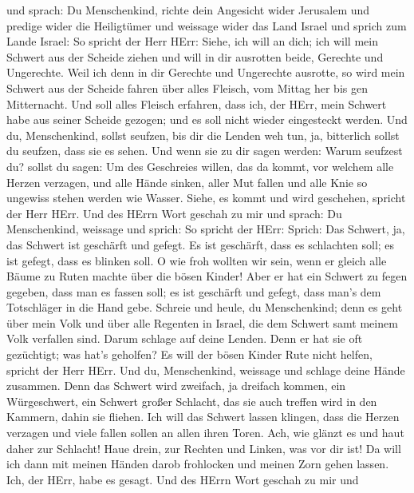 und sprach:  Du Menschenkind, richte dein Angesicht wider
Jerusalem und predige wider die Heiligtümer und weissage wider das Land
Israel  und sprich zum Lande Israel: So spricht der Herr
HErr: Siehe, ich will an dich; ich will mein Schwert aus der Scheide
ziehen und will in dir ausrotten beide, Gerechte und Ungerechte.
 Weil ich denn in dir Gerechte und Ungerechte ausrotte, so
wird mein Schwert aus der Scheide fahren über alles Fleisch, vom Mittag
her bis gen Mitternacht.  Und soll alles Fleisch erfahren,
dass ich, der HErr, mein Schwert habe aus seiner Scheide gezogen; und es
soll nicht wieder eingesteckt werden.  Und du,
Menschenkind, sollst seufzen, bis dir die Lenden weh tun, ja, bitterlich
sollst du seufzen, dass sie es sehen.  Und wenn sie zu dir
sagen werden: Warum seufzest du? sollst du sagen: Um des Geschreies
willen, das da kommt, vor welchem alle Herzen verzagen, und alle Hände
sinken, aller Mut fallen und alle Knie so ungewiss stehen werden wie
Wasser. Siehe, es kommt und wird geschehen, spricht der Herr HErr.
 Und des HErrn Wort geschah zu mir und sprach:
 Du Menschenkind, weissage und sprich: So spricht der HErr:
Sprich: Das Schwert, ja, das Schwert ist geschärft und gefegt.
 Es ist geschärft, dass es schlachten soll; es ist gefegt,
dass es blinken soll. O wie froh wollten wir sein, wenn er gleich alle
Bäume zu Ruten machte über die bösen Kinder!  Aber er hat
ein Schwert zu fegen gegeben, dass man es fassen soll; es ist geschärft
und gefegt, dass man's dem Totschläger in die Hand gebe. 
Schreie und heule, du Menschenkind; denn es geht über mein Volk und über
alle Regenten in Israel, die dem Schwert samt meinem Volk verfallen
sind. Darum schlage auf deine Lenden.  Denn er hat sie oft
gezüchtigt; was hat's geholfen? Es will der bösen Kinder Rute nicht
helfen, spricht der Herr HErr.  Und du, Menschenkind,
weissage und schlage deine Hände zusammen. Denn das Schwert wird
zweifach, ja dreifach kommen, ein Würgeschwert, ein Schwert großer
Schlacht, das sie auch treffen wird in den Kammern, dahin sie fliehen.
 Ich will das Schwert lassen klingen, dass die Herzen
verzagen und viele fallen sollen an allen ihren Toren. Ach, wie glänzt
es und haut daher zur Schlacht!  Haue drein, zur Rechten
und Linken, was vor dir ist!  Da will ich dann mit meinen
Händen darob frohlocken und meinen Zorn gehen lassen. Ich, der HErr,
habe es gesagt.  Und des HErrn Wort geschah zu mir und

